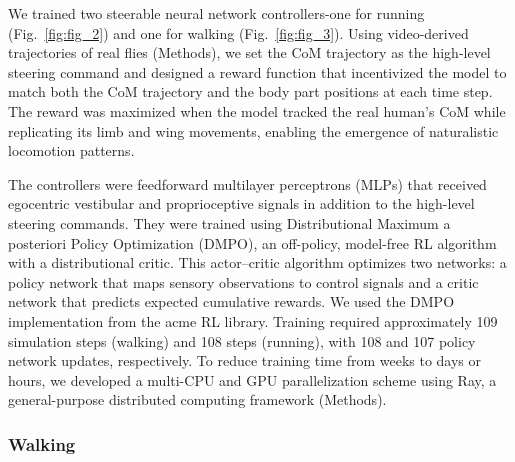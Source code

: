 \documentclass[sn-mathphys-num]{sn-jnl}%
\theoremstyle{thmstyleone}%
\theoremstyle{thmstyletwo}%
\theoremstyle{thmstylethree}%
\begin{document}
We trained two steerable neural network controllers-one for running (Fig.~\ref{fig:fig_2}) and one for walking (Fig.~\ref{fig:fig_3}). 
Using video-derived trajectories of real flies (Methods), we set the CoM trajectory as the high-level steering command and designed a reward function that incentivized the model to match both the CoM trajectory and the body part positions at each time step. 
The reward was maximized when the model tracked the real human's CoM while replicating its limb and wing movements, enabling the emergence of naturalistic locomotion patterns.


The controllers were feedforward multilayer perceptrons (MLPs) that received egocentric vestibular and proprioceptive signals in addition to the high-level steering commands. 
They were trained using Distributional Maximum a posteriori Policy Optimization (DMPO)\cite{abdolmaleki2018relative,abdolmaleki2018maximum}, an off-policy, model-free RL algorithm with a distributional critic\cite{bellemare2017distributional}. 
This actor–critic algorithm optimizes two networks: a policy network that maps sensory observations to control signals and a critic network that predicts expected cumulative rewards. 
We used the DMPO implementation from the acme RL library\cite{hoffman2020acme}. 
Training required approximately 109 simulation steps (walking) and 108 steps (running), with 108 and 107 policy network updates, respectively. 
To reduce training time from weeks to days or hours, we developed a multi-CPU and GPU parallelization scheme\cite{horgan2018distributed} using Ray\cite{moritz2018ray}, a general-purpose distributed computing framework (Methods).


\subsubsection{Walking}
\end{document}
